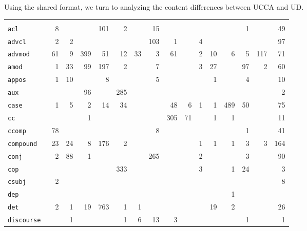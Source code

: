 \documentclass[11pt,a4paper,table]{article}
\begin{document}
Using the shared format,
we turn to analyzing the content differences between UCCA and UD.


\begin{table*}[t]
\centering
\setlength\tabcolsep{5pt}
\def\arraystretch{.815}
\begin{tabular}{lRRRRRRRRRRRRRRR}
 &  & 
 &  & 
 &  & 
 &  & 
 &  & 
 &  & 
 &  & 
 &  \\
\tt acl & 8 &&& 101 & 2 && 15 &&&&&& 1 && 49 \\
\tt advcl & 2 & 2 &&&&& 103 & 1 && 4 &&&&& 97 \\
\tt advmod & 61 & 9 & 399 & 51 & 12 & 33 & 3 & 61 && 2 & 10 & 6 & 5 & 117 & 71 \\
\tt amod & 1 & 33 & 99 & 197 & 2 && 7 &&& 3 & 27 && 97 & 2 & 60 \\
\tt appos & 1 & 10 && 8 &&& 5 &&&& 1 && 4 && 10 \\
\tt aux &&& 96 && 285 &&&&&&&&&& 2 \\
\tt case & 1 & 5 & 2 & 14 & 34 &&& 48 & 6 & 1 & 1 & 489 & 50 && 75 \\
\tt cc &&& 1 &&&&& 305 & 71 && 1 & 1 &&& 11 \\
\tt ccomp & 78 &&&&&& 8 &&&&&& 1 && 41 \\
\tt compound & 23 & 24 & 8 & 176 & 2 &&&&& 1 & 1 & 1 & 3 & 3 & 164 \\
\tt conj & 2 & 88 & 1 &&&& 265 &&& 2 &&& 3 && 90 \\
\tt cop &&&&& 333 &&&&& 3 && 1 & 24 && 3 \\
\tt csubj & 2 &&&&&&&&&&&&&& 8 \\
\tt dep &&&&&&&&&&&& 1 &&&\\
\tt det & 2 & 1 & 19 & 763 & 1 & 1 &&&&& 19 & 2 &&& 26 \\
\tt discourse && 1 &&& 1 & 6 & 13 & 3 &&&&& 1 && 1 \\

\end{tabular}
\end{table*}
\end{document}
